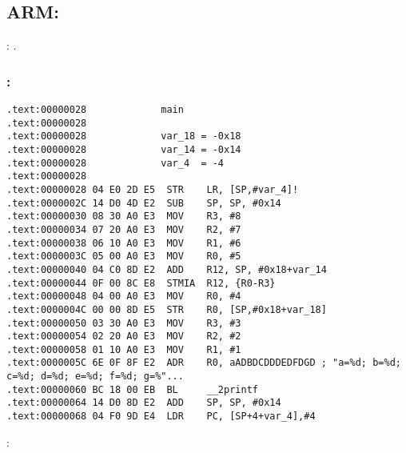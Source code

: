 \subsection{ARM: }

: .



\subsubsection{\OptimizingKeilVI: \ARMMode}

\begin{lstlisting}
.text:00000028             main
.text:00000028
.text:00000028             var_18 = -0x18
.text:00000028             var_14 = -0x14
.text:00000028             var_4  = -4
.text:00000028
.text:00000028 04 E0 2D E5  STR    LR, [SP,#var_4]!
.text:0000002C 14 D0 4D E2  SUB    SP, SP, #0x14
.text:00000030 08 30 A0 E3  MOV    R3, #8
.text:00000034 07 20 A0 E3  MOV    R2, #7
.text:00000038 06 10 A0 E3  MOV    R1, #6
.text:0000003C 05 00 A0 E3  MOV    R0, #5
.text:00000040 04 C0 8D E2  ADD    R12, SP, #0x18+var_14
.text:00000044 0F 00 8C E8  STMIA  R12, {R0-R3}
.text:00000048 04 00 A0 E3  MOV    R0, #4
.text:0000004C 00 00 8D E5  STR    R0, [SP,#0x18+var_18]
.text:00000050 03 30 A0 E3  MOV    R3, #3
.text:00000054 02 20 A0 E3  MOV    R2, #2
.text:00000058 01 10 A0 E3  MOV    R1, #1
.text:0000005C 6E 0F 8F E2  ADR    R0, aADBDCDDDEDFDGD ; "a=%d; b=%d; c=%d; d=%d; e=%d; f=%d; g=%"...
.text:00000060 BC 18 00 EB  BL     __2printf
.text:00000064 14 D0 8D E2  ADD    SP, SP, #0x14
.text:00000068 04 F0 9D E4  LDR    PC, [SP+4+var_4],#4
\end{lstlisting}

:

